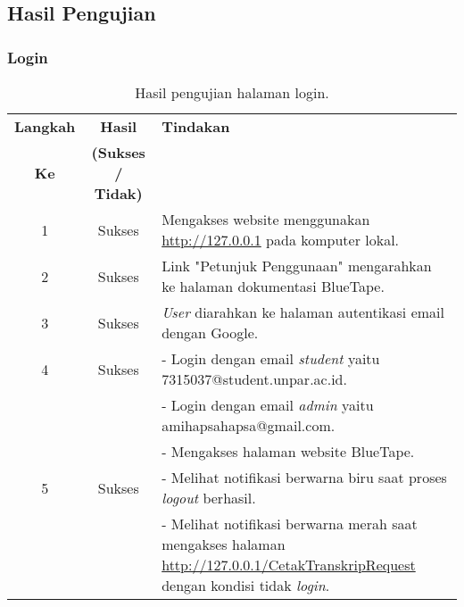 \subsection{Hasil Pengujian}
\subsubsection{Login}
\begin{table}[H]
	\centering 
	\caption{Hasil pengujian halaman login.}
	\label{hasil:Login}
	\begin{tabular}{|c|c|p{}|}
		\toprule
		\textbf{Langkah} & \textbf{Hasil} & \textbf{Tindakan}\\
		\textbf{Ke} & \textbf{(Sukses / Tidak)} & \\		
		\midrule
		1 & Sukses & Mengakses website menggunakan \url{http://127.0.0.1} pada komputer lokal.\\
		\hline
		2 & Sukses & Link "Petunjuk Penggunaan" mengarahkan ke halaman dokumentasi BlueTape.\\
		\hline
		3 & Sukses & \textit{User} diarahkan ke halaman autentikasi email dengan Google.\\
		\hline
		4 & Sukses & - Login dengan email \textit{student} yaitu 7315037@student.unpar.ac.id.\\
		&& - Login dengan email \textit{admin} yaitu amihapsahapsa@gmail.com.\\
		&& - Mengakses halaman website BlueTape.\\									
		\hline
		5 & Sukses & - Melihat notifikasi berwarna biru saat proses \textit{logout} berhasil.\\
		&& - Melihat notifikasi berwarna merah saat mengakses halaman \url{http://127.0.0.1/CetakTranskripRequest} dengan kondisi tidak \textit{login}.\\
		\bottomrule		
	\end{tabular} 
\end{table}

